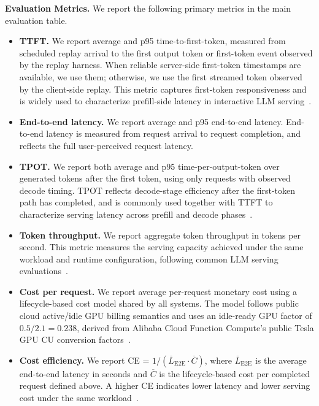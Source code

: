 \documentclass[lettersize,journal]{IEEEtran}
\begin{document}
\textbf{Evaluation Metrics.}
We report the following primary metrics in the main evaluation table.

\begin{itemize}
    \item \textbf{TTFT.} We report average and p95 time-to-first-token, measured from scheduled replay arrival to the first output token or first-token event observed by the replay harness. When reliable server-side first-token timestamps are available, we use them; otherwise, we use the first streamed token observed by the client-side replay. This metric captures first-token responsiveness and is widely used to characterize prefill-side latency in interactive LLM serving~\cite{DistServe}.
    \item \textbf{End-to-end latency.} We report average and p95 end-to-end latency. End-to-end latency is measured from request arrival to request completion, and reflects the full user-perceived request latency.
    \item \textbf{TPOT.} We report both average and p95 time-per-output-token over generated tokens after the first token, using only requests with observed decode timing. TPOT reflects decode-stage efficiency after the first-token path has completed, and is commonly used together with TTFT to characterize serving latency across prefill and decode phases~\cite{DistServe}.
    \item \textbf{Token throughput.} We report aggregate token throughput in tokens per second. This metric measures the serving capacity achieved under the same workload and runtime configuration, following common LLM serving evaluations~\cite{vLLM}.
    \item \textbf{Cost per request.} We report average per-request monetary cost using a lifecycle-based cost model shared by all systems. The model follows public cloud active/idle GPU billing semantics and uses an idle-ready GPU factor of \(0.5/2.1=0.238\), derived from Alibaba Cloud Function Compute's public Tesla GPU CU conversion factors~\cite{AlibabaFCBilling,AlibabaFCIdleGPU}.
    \item \textbf{Cost efficiency.} We report CE = \(1/(\overline{L}_{\mathrm{E2E}}\cdot \overline{C})\), where \(\overline{L}_{\mathrm{E2E}}\) is the average end-to-end latency in seconds and \(\overline{C}\) is the lifecycle-based cost per completed request defined above. A higher CE indicates lower latency and lower serving cost under the same workload~\cite{ServerlessLoRA}.
\end{itemize}
\end{document}
